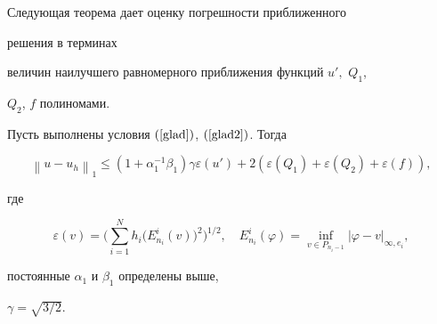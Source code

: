 Следующая теорема дает оценку погрешности приближенного


решения в терминах


величин наилучшего равномерного приближения функций $u',$ $Q_1$,


$Q_2$, $f$ полиномами.





\begin{thm} \label{tocnost}


Пусть выполнены условия $(\ref{glad})$, $(\ref{glad2})$. Тогда


\begin{equation} \label{Err_Est_1}


\left\| {u-u_h} \right\|_{1} \le


(1+\alpha_1^{-1}\beta_1)\gamma \varepsilon \left({u'} \right)+


2\left (\varepsilon \left({Q_1} \right) +\varepsilon \left({Q_2}


\right)+ \varepsilon \left({f} \right)\right),


\end{equation}


где


$$


\varepsilon(v)= \bigg(\sum _{i=1}^{N} h_i \big(E^i_{n_i}(v) \big)^2


\bigg)^{1/2}, \quad


E^i_{n_i}(\varphi)= \inf_{v\in P_{n_i-1}} |\varphi-v |_{\infty,e_i},


$$


постоянные $\alpha_1$ и $\beta_1$ определены выше,


$\gamma=\sqrt{3/2}$.


\end{thm}





